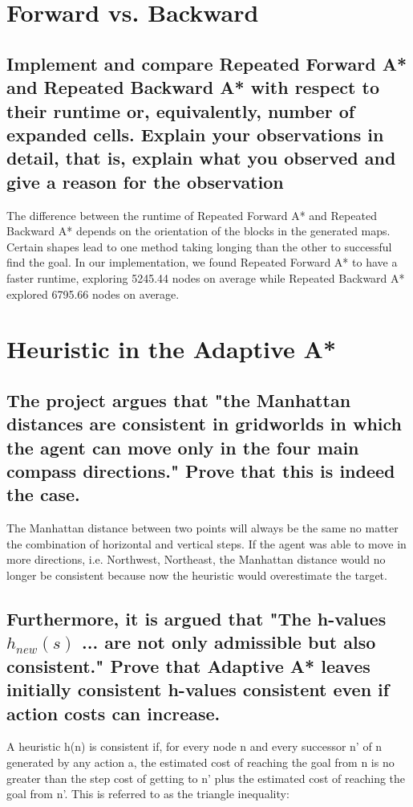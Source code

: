 \documentclass[paper=a4, fontsize=11pt]{scrartcl} %
\begin{document}
\section{Forward vs. Backward}
\subsection*{Implement and compare Repeated Forward A* and Repeated Backward A*
with respect to their runtime or, equivalently, number of expanded cells. Explain your observations in detail, that is, explain what you observed and give a reason for the observation}

The difference between the runtime of Repeated Forward A* and Repeated Backward A* depends on the orientation of the blocks in the generated maps. Certain shapes lead to one method taking longing than the other to successful find the goal. In our implementation, we found Repeated Forward A* to have a faster runtime, exploring 5245.44 nodes on average while Repeated Backward A* explored 6795.66 nodes on average. 


\section{Heuristic in the Adaptive A*}
\subsection*{The project argues that "the Manhattan distances are consistent in
gridworlds in which the agent can move only in the four main compass directions." Prove that this is indeed the case.}

The Manhattan distance between two points will always be the same no matter the combination of horizontal and vertical steps. If the agent was able to move in more directions, i.e. Northwest, Northeast, the Manhattan distance would no longer be consistent because now the heuristic would overestimate the target. 

\subsection*{Furthermore, it is argued that "The h-values $h_{new} ( s )$
... are not only admissible but also consistent." Prove that Adaptive A*
leaves initially consistent h-values consistent even if action costs can increase.}

A heuristic h(n) is consistent if, for every node n and every successor n' of n generated by any action a, the estimated cost of reaching the goal from n is no greater than the step cost of getting to n' plus the estimated cost of reaching the goal from n'. This is referred to as the triangle inequality: \newline
\end{document}
